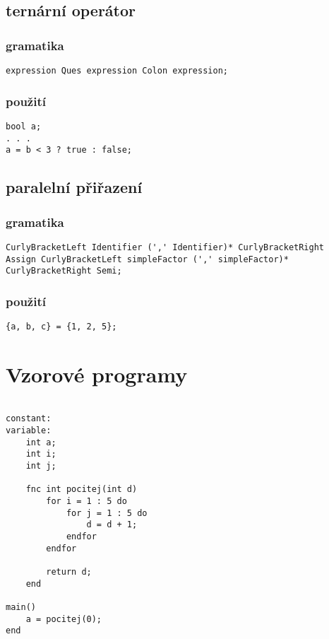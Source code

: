 \documentclass{style}
\begin{document}
\subsection{ternární operátor}
\subsubsection{gramatika}
\begin{lstlisting}
expression Ques expression Colon expression;
\end{lstlisting}

\subsubsection{použití}
\begin{lstlisting}
bool a;
. . .
a = b < 3 ? true : false;
\end{lstlisting}

\subsection{paralelní přiřazení}
\subsubsection{gramatika}
\begin{lstlisting}
CurlyBracketLeft Identifier (',' Identifier)* CurlyBracketRight 
Assign CurlyBracketLeft simpleFactor (',' simpleFactor)* 
CurlyBracketRight Semi;
\end{lstlisting}

\subsubsection{použití}
\begin{lstlisting}
{a, b, c} = {1, 2, 5};
\end{lstlisting}

\section{Vzorové programy}
\begin{minipage}{\linewidth}
\begin{lstlisting}[frame=single]  % Start your code-block

constant:
variable:
    int a;
    int i;
    int j;

    fnc int pocitej(int d)
        for i = 1 : 5 do
            for j = 1 : 5 do
                d = d + 1;
            endfor
        endfor

        return d;
    end

main()
    a = pocitej(0);
end
\end{lstlisting}
\end{minipage}
\end{document}

